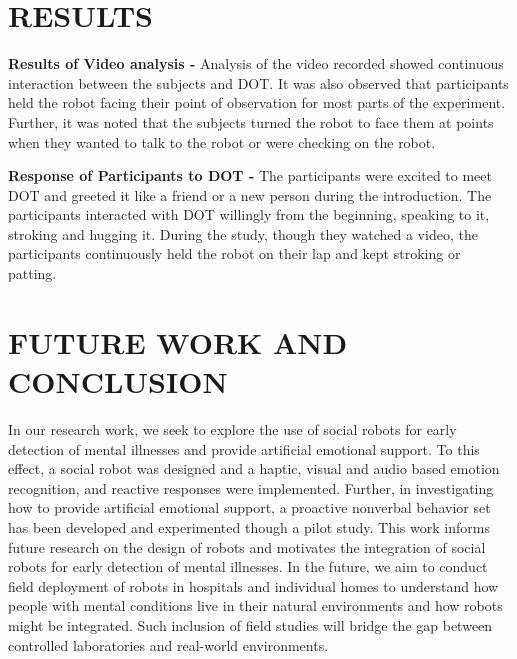 \documentclass[letterpaper, 10 pt, conference]{ieeeconf}  %
\begin{document}

\section{RESULTS}
\textbf{Results of Video analysis -}
Analysis of the video recorded showed continuous interaction between the subjects and DOT. It was also observed that participants held the robot facing their point of observation for most parts of the experiment. Further, it was noted that the subjects turned the robot to face them at points when they wanted to talk to the robot or were checking on the robot. 


\textbf{Response of Participants to DOT -} The participants were excited to meet DOT and greeted it like a friend or a new person during the introduction. The participants interacted with DOT willingly from the beginning, speaking to it, stroking and hugging it. During the study, though they watched a video, the participants continuously
held the robot on their lap and kept stroking or patting.

\section{FUTURE WORK AND CONCLUSION}

In our research work, we seek to explore the use of social robots for early detection of mental illnesses and provide artificial emotional support. To this effect, a social robot was designed and a haptic, visual and audio based emotion recognition, and reactive responses were implemented. Further, in investigating how to provide artificial emotional support, a proactive nonverbal behavior set has been developed and experimented though a pilot study. This work informs future research on the design of robots and motivates the integration of social robots for early detection of mental illnesses. In the future, we aim to conduct field deployment of robots in hospitals and individual homes to understand how people with mental conditions live in their natural environments and how robots might be integrated. Such inclusion of field studies will bridge the gap between controlled laboratories and real-world environments. 
\end{document}
